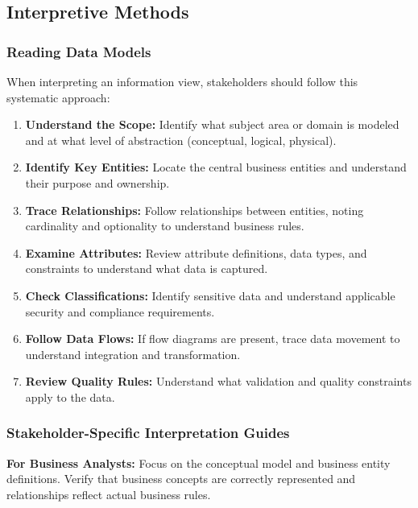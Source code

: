 \documentclass[11pt,letterpaper]{article}
\begin{document}
\subsection{Interpretive Methods}

\subsubsection{Reading Data Models}

When interpreting an information view, stakeholders should follow this systematic approach:

\begin{enumerate}
    \item \textbf{Understand the Scope:} Identify what subject area or domain is modeled and at what level of abstraction (conceptual, logical, physical).
    
    \item \textbf{Identify Key Entities:} Locate the central business entities and understand their purpose and ownership.
    
    \item \textbf{Trace Relationships:} Follow relationships between entities, noting cardinality and optionality to understand business rules.
    
    \item \textbf{Examine Attributes:} Review attribute definitions, data types, and constraints to understand what data is captured.
    
    \item \textbf{Check Classifications:} Identify sensitive data and understand applicable security and compliance requirements.
    
    \item \textbf{Follow Data Flows:} If flow diagrams are present, trace data movement to understand integration and transformation.
    
    \item \textbf{Review Quality Rules:} Understand what validation and quality constraints apply to the data.
\end{enumerate}

\subsubsection{Stakeholder-Specific Interpretation Guides}

\textbf{For Business Analysts:}
Focus on the conceptual model and business entity definitions. Verify that business concepts are correctly represented and relationships reflect actual business rules.
\end{document}
